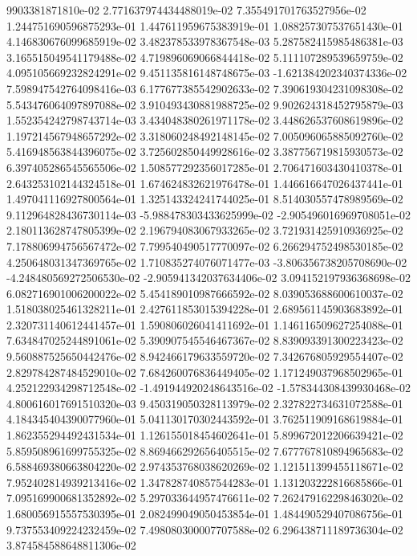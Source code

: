 9903381871810e-02	2.771637974434488019e-02	7.355491701763527956e-02	1.244751690596875293e-01	1.447611959675383919e-01	1.088257307537651430e-01	4.146830676099685919e-02	3.482378533978367548e-03	5.287582415985486381e-03	3.165515049541179488e-02	4.719896069066844418e-02	5.111107289539659759e-02	4.095105669232824291e-02	9.451135816148748675e-03	-1.621384202340374336e-02	7.598947542764098416e-03	6.177677385542902633e-02	7.390619304231098308e-02	5.543476064097897088e-02	3.910493430881988725e-02	9.902624318452795879e-03	1.552354242798743714e-03	3.434048380261971178e-02	3.448626537608619896e-02	1.197214567948657292e-02	3.318060248492148145e-02	7.005096065885092760e-02	5.416948563844396075e-02	3.725602850449928616e-02	3.387756719815930573e-02	6.397405286545565506e-02	1.508577292356017285e-01	2.706471603430410378e-01	2.643253102144324518e-01	1.674624832621976478e-01	1.446616647026437441e-01	1.497041116927800564e-01	1.325143324241744025e-01	8.514030557478989569e-02	9.112964828436730114e-03	-5.988478303433625999e-02	-2.905496016969708051e-02	2.180113628747805399e-02	2.196794083067933265e-02	3.721931425910936925e-02	7.178806994756567472e-02	7.799540490517770097e-02	6.266294752498530185e-02	4.250648031347369765e-02	1.710835274076071477e-03	-3.806356738205708690e-02	-4.248480569272506530e-02	-2.905941342037634406e-02	3.094152197936368698e-02	6.082716901006200022e-02	5.454189010987666592e-02	8.039053688600610037e-02	1.518038025461328211e-01	2.427611853015394228e-01	2.689561145903683892e-01	2.320731140612441457e-01	1.590806026041411692e-01	1.146116509627254088e-01	7.634847025244891061e-02	5.390907545546467367e-02	8.839093391300223423e-02	9.560887525650442476e-02	8.942466179633559720e-02	7.342676805929554407e-02	2.829784287484529010e-02	7.684260076836449405e-02	1.171249037968502965e-01	4.252122934298712548e-02	-1.491944920248643516e-02	-1.578344308439930468e-02	4.800616017691510320e-03	9.450319050328113979e-02	2.327822734631072588e-01	4.184345404390077960e-01	5.041130170302443592e-01	3.762511909168619884e-01	1.862355294492431534e-01	1.126155018454602641e-01	5.899672012206639421e-02	5.859508961699755325e-02	8.869466292656405515e-02	7.677767810894965683e-02	6.588469380663804220e-02	2.974353768038620269e-02	1.121511399455118671e-02	7.952402814939213416e-02	1.347828740857544283e-01	1.131203222816685866e-01	7.095169900681352892e-02	5.297033644957476611e-02	7.262479162298463020e-02	1.680056915557530395e-01	2.082499049050453854e-01	1.484490529407086756e-01	9.737553409224232459e-02	7.498080300007707588e-02	6.296438711189736304e-02	3.874584588648811306e-02
